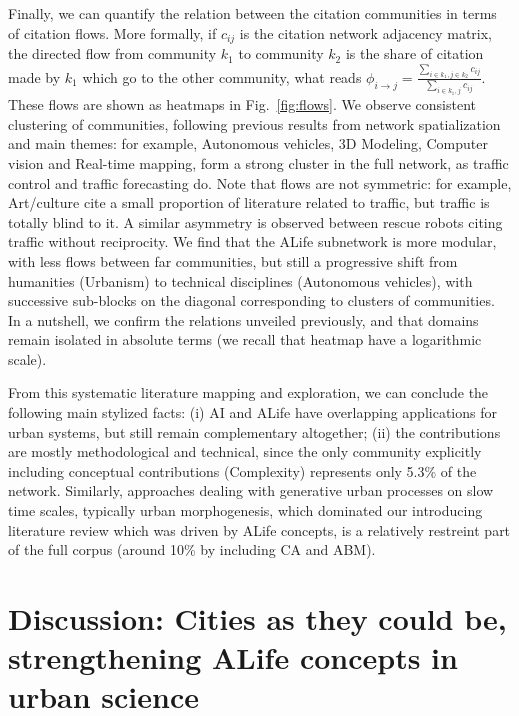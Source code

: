 \documentclass[letterpaper]{article}
\begin{document}
Finally, we can quantify the relation between the citation communities in terms of citation flows. More formally, if $c_{ij}$ is the citation network adjacency matrix, the directed flow from community $k_1$ to community $k_2$ is the share of citation made by $k_1$ which go to the other community, what reads $\phi_{i \rightarrow j} = \frac{\sum_{i\in k_1,j\in k_2} c_{ij}}{\sum_{i\in k_1,j} c_{ij}}$. These flows are shown as heatmaps in Fig.~\ref{fig:flows}. We observe consistent clustering of communities, following previous results from network spatialization and main themes: for example, Autonomous vehicles, 3D Modeling, Computer vision and Real-time mapping, form a strong cluster in the full network, as traffic control and traffic forecasting do. Note that flows are not symmetric: for example, Art/culture cite a small proportion of literature related to traffic, but traffic is totally blind to it. A similar asymmetry is observed between rescue robots citing traffic without reciprocity. We find that the ALife subnetwork is more modular, with less flows between far communities, but still a progressive shift from humanities (Urbanism) to technical disciplines (Autonomous vehicles), with successive sub-blocks on the diagonal corresponding to clusters of communities. In a nutshell, we confirm the relations unveiled previously, and that domains remain isolated in absolute terms (we recall that heatmap have a logarithmic scale).


From this systematic literature mapping and exploration, we can conclude the following main stylized facts: (i) AI and ALife have overlapping applications for urban systems, but still remain complementary altogether; (ii) the contributions are mostly methodological and technical, since the only community explicitly including conceptual contributions (Complexity) represents only 5.3\% of the network. Similarly, approaches dealing with generative urban processes on slow time scales, typically urban morphogenesis, which dominated our introducing literature review which was driven by ALife concepts, is a relatively restreint part of the full corpus (around 10\% by including CA and ABM).







\section{Discussion: Cities as they could be, strengthening ALife concepts in urban science}
\end{document}
